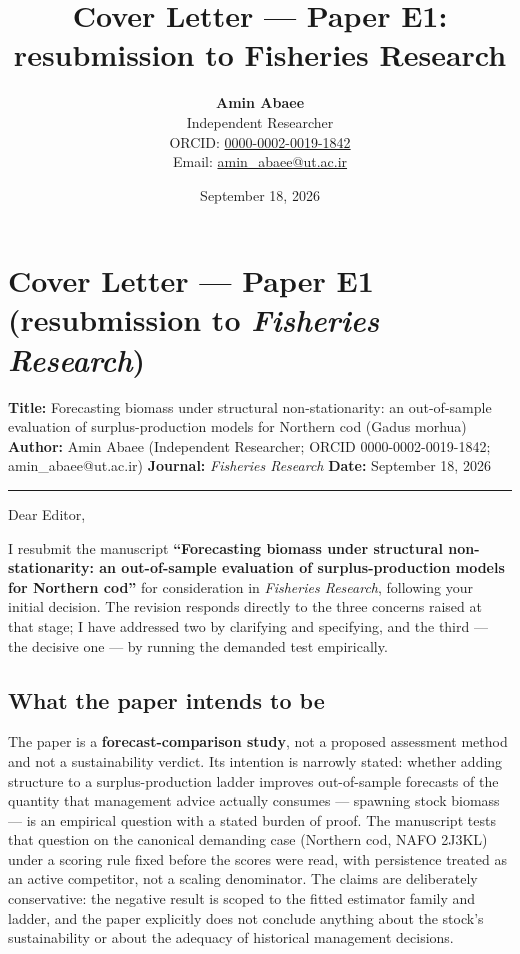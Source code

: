 \documentclass[11pt]{article}
\title{Cover Letter — Paper E1: resubmission to Fisheries Research}
\author{\textbf{Amin Abaee}\\ Independent Researcher\\[2pt] ORCID: \href{https://orcid.org/0000-0002-0019-1842}{0000-0002-0019-1842}\\ Email: \href{mailto:amin_abaee@ut.ac.ir}{amin_abaee@ut.ac.ir}}
\date{September 18, 2026}
\begin{document}
\maketitle

\section{\texorpdfstring{Cover Letter --- Paper E1 (resubmission to
\emph{Fisheries
Research})}{Cover Letter --- Paper E1 (resubmission to Fisheries Research)}}\label{cover-letter-paper-e1-resubmission-to-fisheries-research}

\textbf{Title:} Forecasting biomass under structural non-stationarity:
an out-of-sample evaluation of surplus-production models for Northern
cod (Gadus morhua) \textbf{Author:} Amin Abaee (Independent Researcher;
ORCID 0000-0002-0019-1842; amin\_abaee@ut.ac.ir) \textbf{Journal:}
\emph{Fisheries Research} \textbf{Date:} September 18, 2026

\begin{center}\rule{0.5\linewidth}{0.5pt}\end{center}

Dear Editor,

I resubmit the manuscript \textbf{``Forecasting biomass under structural
non-stationarity: an out-of-sample evaluation of surplus-production
models for Northern cod''} for consideration in \emph{Fisheries
Research}, following your initial decision. The revision responds
directly to the three concerns raised at that stage; I have addressed
two by clarifying and specifying, and the third --- the decisive one ---
by running the demanded test empirically.

\subsection{What the paper intends to
be}\label{what-the-paper-intends-to-be}

The paper is a \textbf{forecast-comparison study}, not a proposed
assessment method and not a sustainability verdict. Its intention is
narrowly stated: whether adding structure to a surplus-production ladder
improves out-of-sample forecasts of the quantity that management advice
actually consumes --- spawning stock biomass --- is an empirical
question with a stated burden of proof. The manuscript tests that
question on the canonical demanding case (Northern cod, NAFO 2J3KL)
under a scoring rule fixed before the scores were read, with persistence
treated as an active competitor, not a scaling denominator. The claims
are deliberately conservative: the negative result is scoped to the
fitted estimator family and ladder, and the paper explicitly does not
conclude anything about the stock's sustainability or about the adequacy
of historical management decisions.
\end{document}

